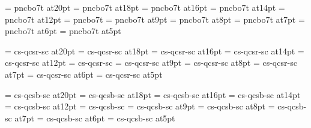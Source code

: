 \font\twentyslbf=      pncbo7t at20pt
\font\eighteenslbf=    pncbo7t at18pt
\font\sixteenslbf=     pncbo7t at16pt
\font\fourteenslbf=    pncbo7t at14pt
\font\twelveslbf=      pncbo7t at12pt
\font\slbf=            pncbo7t
\font\nineslbf=        pncbo7t at9pt
\font\eightslbf=       pncbo7t at8pt
\font\sevenslbf=       pncbo7t at7pt
\font\sixslbf=         pncbo7t at6pt
\font\fiveslbf=        pncbo7t at5pt

\font\twentycaps=      cs-qcsr-sc at20pt
\font\eighteencaps=    cs-qcsr-sc at18pt
\font\sixteencaps=     cs-qcsr-sc at16pt
\font\fourteencaps=    cs-qcsr-sc at14pt
\font\twelvecaps=      cs-qcsr-sc at12pt
\font\caps=            cs-qcsr-sc
\font\ninecaps=        cs-qcsr-sc at9pt
\font\eightcaps=       cs-qcsr-sc at8pt
\font\sevencaps=       cs-qcsr-sc at7pt
\font\sixcaps=         cs-qcsr-sc at6pt
\font\fivecaps=        cs-qcsr-sc at5pt

\font\twentycapsbf=      cs-qcsb-sc at20pt
\font\eighteencapsbf=    cs-qcsb-sc at18pt
\font\sixteencapsbf=     cs-qcsb-sc at16pt
\font\fourteencapsbf=    cs-qcsb-sc at14pt
\font\twelvecapsbf=      cs-qcsb-sc at12pt
\font\capsbf=            cs-qcsb-sc
\font\ninecapsbf=        cs-qcsb-sc at9pt
\font\eightcapsbf=       cs-qcsb-sc at8pt
\font\sevencapsbf=       cs-qcsb-sc at7pt
\font\sixcapsbf=         cs-qcsb-sc at6pt
\font\fivecapsbf=        cs-qcsb-sc at5pt

\rm 